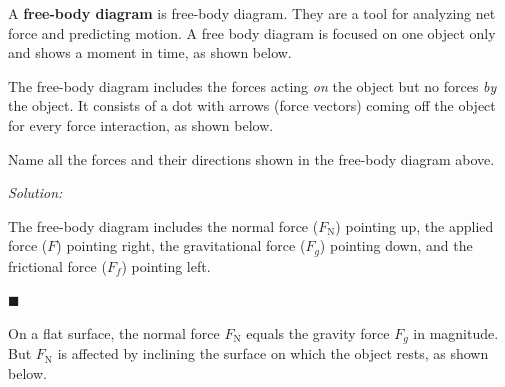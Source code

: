 \documentclass[dvipsnames]{article}
\begin{document}
A \textbf{\gls{free-body diagram}} is \glsdesc{free-body diagram}. They are a tool for analyzing net force and predicting motion. A free body diagram is focused on one object only and shows a moment in time, as shown below.

\begin{center}
\end{center}

The free-body diagram includes the forces acting \textit{on} the object but no forces \textit{by} the object. It consists of a dot with arrows (force vectors) coming off the object for every force interaction, as shown below.

\begin{example}
    Name all the forces and their directions shown in the free-body diagram above.
\end{example}

\textit{Solution:}

The free-body diagram includes the normal force ($F_\mathrm{N}$) pointing up, the applied force ($F$) pointing right, the gravitational force ($F_g$) pointing down, and the frictional force ($F_f$) pointing left. 

\hfill $\blacksquare$

On a flat surface, the normal force $F_\mathrm{N}$ equals the gravity force $F_g$ in magnitude. But $F_\mathrm{N}$ is affected by inclining the surface on which the object rests, as shown below.
\end{document}
